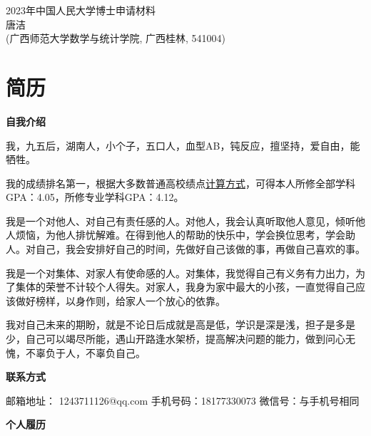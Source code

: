 \documentclass[UFT8]{ctexart}
\begin{document}
\thispagestyle{empty} 
\vspace*{3cm}
\begin{center}
{{\LARGE\heiti 2023年中国人民大学博士申请材料}\\[0.6cm]
{\normalsize 唐洁}\\[0.1cm]
{\small(广西师范大学数学与统计学院, 广西桂林, 541004)}}
\end{center}

\clearpage%
\tableofcontents%
\thispagestyle{empty} %


\clearpage%
\setcounter{page}{1}%

\clearpage%
\section{简历}

\bigskip
\begin{center}
{ \bf \kaishu \large  自我介绍}
\end{center}

我，九五后，湖南人，小个子，五口人，血型AB，钝反应，擅坚持，爱自由，能牺牲。

我的成绩排名第一，根据大多数普通高校绩点\href{https://tang-jay.github.io/certificate/GPA.pdf}{\uline{计算方式}}，可得本人所修全部学科GPA：4.05，所修专业学科GPA：4.12。

我是一个对他人、对自己有责任感的人。对他人，我会认真听取他人意见，倾听他人烦恼，为他人排忧解难。在得到他人的帮助的快乐中，学会换位思考，学会助人。对自己，我会安排好自己的时间，先做好自己该做的事，再做自己喜欢的事。

我是一个对集体、对家人有使命感的人。对集体，我觉得自己有义务有力出力，为了集体的荣誉不计较个人得失。对家人，我身为家中最大的小孩，一直觉得自己应该做好榜样，以身作则，给家人一个放心的依靠。

我对自己未来的期盼，就是不论日后成就是高是低，学识是深是浅，担子是多是少，自己可以竭尽所能，遇山开路逢水架桥，提高解决问题的能力，做到问心无愧，不辜负于人，不辜负自己。

\bigskip
\begin{center}
{ \bf \kaishu \large   联系方式}
\end{center}

邮箱地址： 1243711126@qq.com     \quad    手机号码：18177330073    \quad  微信号：与手机号相同

\bigskip
\begin{center}
{ \bf \kaishu \large   个人履历}
\end{center}
 
\end{document}
